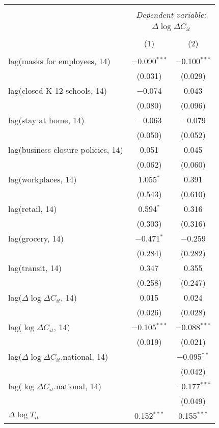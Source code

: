 \begin{tabular}{@{\extracolsep{1pt}}lcc} 
\\[-1.8ex]\hline 
\hline \\[-1.8ex] 
 & \multicolumn{2}{c}{\textit{Dependent variable:}} \\ 
\cline{2-3} 
 & \multicolumn{2}{c}{$\Delta \log \Delta C_{it}$} \\ 
\\[-1.8ex] & (1) & (2)\\ 
\hline \\[-1.8ex] 
 lag(masks for employees, 14) & $-$0.090$^{***}$ & $-$0.100$^{***}$ \\ 
  & (0.031) & (0.029) \\ 
  lag(closed K-12 schools, 14) & $-$0.074 & 0.043 \\ 
  & (0.080) & (0.096) \\ 
  lag(stay at home, 14) & $-$0.063 & $-$0.079 \\ 
  & (0.050) & (0.052) \\ 
  lag(business closure policies, 14) & 0.051 & 0.045 \\ 
  & (0.062) & (0.060) \\ 
  lag(workplaces, 14) & 1.055$^{*}$ & 0.391 \\ 
  & (0.543) & (0.610) \\ 
  lag(retail, 14) & 0.594$^{*}$ & 0.316 \\ 
  & (0.303) & (0.316) \\ 
  lag(grocery, 14) & $-$0.471$^{*}$ & $-$0.259 \\ 
  & (0.284) & (0.282) \\ 
  lag(transit, 14) & 0.347 & 0.355 \\ 
  & (0.258) & (0.247) \\ 
  lag($\Delta \log \Delta C_{it}$, 14) & 0.015 & 0.024 \\ 
  & (0.026) & (0.028) \\ 
  lag($\log \Delta C_{it}$, 14) & $-$0.105$^{***}$ & $-$0.088$^{***}$ \\ 
  & (0.019) & (0.021) \\ 
  lag($\Delta \log \Delta C_{it}$.national, 14) &  & $-$0.095$^{**}$ \\ 
  &  & (0.042) \\ 
  lag($\log \Delta C_{it}$.national, 14) &  & $-$0.177$^{***}$ \\ 
  &  & (0.049) \\ 
  $\Delta \log T_{it}$ & 0.152$^{***}$ & 0.155$^{***}$ \\ 

\end{tabular}
